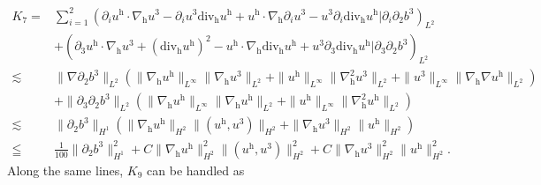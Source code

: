 \documentclass[11pt]{amsart}
\theoremstyle{definition}
\newcommand{\h}{\mathrm{h}}
\numberwithin{equation}{section}
\begin{document}
\begin{align}\label{K7}
	K_{7}=&\sum_{i=1}^{2}
	\left(\partial_{i}u^\mathrm{h}\cdot\nabla_{\mathrm{h}}u^3-\partial_{i}u^3\mathrm{div_h}u^\mathrm{h}+u^\mathrm{h}\cdot\nabla_{\mathrm{h}}\partial_{i}u^3-u^3\partial_{i}\mathrm{div_h}u^\mathrm{h}|\partial_{i}\partial_{2}b^3\right)_{L^2}\nonumber\\
	&+\left(\partial_{3}u^\mathrm{h}\cdot\nabla_{\mathrm{h}}u^3+(\mathrm{div_h}u^\h)^2-u^\mathrm{h}\cdot\nabla_{\mathrm{h}}\mathrm{div_h}u^\h+u^3\partial_{3}\mathrm{div_h}u^\h|\partial_{3}\partial_{2}b^3\right)_{L^2}\nonumber\\
	\lesssim &\|\nabla\partial_{2}b^3\|_{L^2}\left(\|\nabla_\h u^\mathrm{h}\|_{L^\infty}\|\nabla_{\mathrm{h}}u^3\|_{L^2}+\|u^\mathrm{h}\|_{L^\infty}\|\nabla_{\mathrm{h}}^2u^3\|_{L^2}+\|u^3\|_{L^\infty}\|\nabla_\h\nabla u^\h\|_{L^2}\right)\nonumber\\
	&+\|\partial_3\partial_{2}b^3\|_{L^2}\left(\|\nabla_\h u^\mathrm{h}\|_{L^\infty}\|\nabla_{\mathrm{h}}u^\h\|_{L^2}+\|u^\mathrm{h}\|_{L^\infty}\|\nabla_{\mathrm{h}}^2u^\h\|_{L^2}\right)\nonumber\\
	\lesssim&\|\partial_{2}b^3\|_{H^1}\left(\|\nabla_\h u^\mathrm{h}\|_{H^2}\|(u^\h,u^3)\|_{H^2}+\|\nabla_{\mathrm{h}}u^3\|_{H^2}\|u^\mathrm{h}\|_{H^2}\right)\nonumber\\
	\leqq& \frac{1}{100}\|\partial_{2}b^3\|_{H^1}^2+C\|\nabla_\h u^\mathrm{h}\|_{H^2}^2\|(u^\h,u^3)\|_{H^2}^2+C\|\nabla_{\mathrm{h}}u^3\|_{H^2}^2\|u^\mathrm{h}\|_{H^2}^2.
\end{align}
Along the same lines, $K_9$ can be handled as
\end{document}
